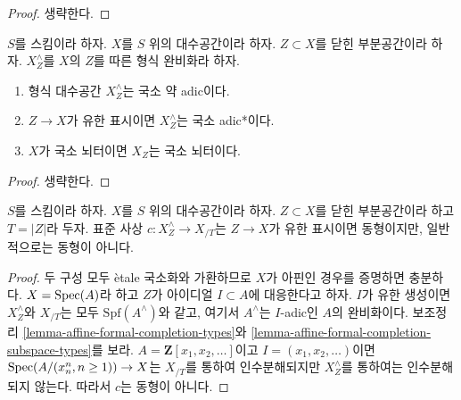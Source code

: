 \begin{proof}
생략한다.
\end{proof}

\begin{lemma}
\label{lemma-formal-completion-subspace-types}
$S$를 스킴이라 하자. $X$를 $S$ 위의 대수공간이라 하자.
$Z \subset X$를 닫힌 부분공간이라 하자. $X^\wedge_Z$를
$X$의 $Z$를 따른 형식 완비화라 하자.
\begin{enumerate}
\item 형식 대수공간 $X^\wedge_Z$는 국소 약 adic이다.
\item $Z \to X$가 유한 표시이면 $X^\wedge_Z$는 국소 adic*이다.
\item $X$가 국소 뇌터이면 $X_Z$는 국소 뇌터이다.
\end{enumerate}
\end{lemma}

\begin{proof}
생략한다.
\end{proof}

\begin{lemma}
\label{lemma-when-isomorphism}
$S$를 스킴이라 하자. $X$를 $S$ 위의 대수공간이라 하자.
$Z \subset X$를 닫힌 부분공간이라 하고 $T = |Z|$라 두자. 표준 사상
$c : X^\wedge_Z \to X_{/T}$는 $Z \to X$가 유한 표시이면 동형이지만,
일반적으로는 동형이 아니다.
\end{lemma}

\begin{proof}
두 구성 모두 \`etale 국소화와 가환하므로 $X$가 아핀인 경우를
증명하면 충분하다. $X = \mathop{\mathrm{Spec}}(A)$라 하고 $Z$가 아이디얼
$I \subset A$에 대응한다고 하자. $I$가 유한 생성이면
$X^\wedge_Z$와 $X_{/T}$는 모두 $\text{Spf}(A^\wedge)$와 같고,
여기서 $A^\wedge$는 $I$-adic인 $A$의 완비화이다. 보조정리
\ref{lemma-affine-formal-completion-types}와
\ref{lemma-affine-formal-completion-subspace-types}를 보라.
$A = \mathbf{Z}[x_1, x_2, \ldots]$이고 $I = (x_1, x_2, \ldots)$이면
$\mathop{\mathrm{Spec}}(A/(x_n^n, n \geq 1)) \to X$는 $X_{/T}$를 통하여 인수분해되지만
$X^\wedge_Z$를 통하여는 인수분해되지 않는다. 따라서 $c$는 동형이 아니다.
\end{proof}












